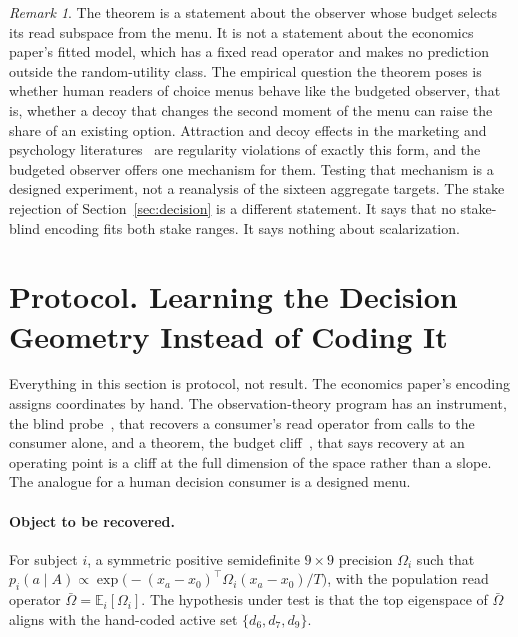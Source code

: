 \documentclass[11pt]{article}
\theoremstyle{definition}
\theoremstyle{remark}
\newtheorem*{remark}{Remark}
\newcommand{\E}{\mathbb{E}}
\begin{document}
\begin{remark}
The theorem is a statement about the observer whose budget selects its read subspace from the menu.
It is not a statement about the economics paper's fitted model, which has a fixed read operator and makes no prediction outside the random-utility class.
The empirical question the theorem poses is whether human readers of choice menus behave like the budgeted observer, that is, whether a decoy that changes the second moment of the menu can raise the share of an existing option.
Attraction and decoy effects in the marketing and psychology literatures~\cite{huber1982} are regularity violations of exactly this form, and the budgeted observer offers one mechanism for them.
Testing that mechanism is a designed experiment, not a reanalysis of the sixteen aggregate targets.
The stake rejection of Section~\ref{sec:decision} is a different statement. It says that no stake-blind encoding fits both stake ranges. It says nothing about scalarization.
\end{remark}

\section{Protocol. Learning the Decision Geometry Instead of Coding It}
\label{sec:learned}

Everything in this section is protocol, not result.
The economics paper's encoding assigns coordinates by hand.
The observation-theory program has an instrument, the blind probe~\cite{bond2026readscope,bond2026encyclopedia}, that recovers a consumer's read operator from calls to the consumer alone, and a theorem, the budget cliff~\cite{bond2026encyclopedia}, that says recovery at an operating point is a cliff at the full dimension of the space rather than a slope.
The analogue for a human decision consumer is a designed menu.

\paragraph{Object to be recovered.}
For subject $i$, a symmetric positive semidefinite $9\times9$ precision $\Omega_{i}$ such that $p_{i}(a\mid A)\propto\exp\bigl(-(x_{a}-x_{0})^{\top}\Omega_{i}(x_{a}-x_{0})/T\bigr)$, with the population read operator $\bar{\Omega}=\E_{i}[\Omega_{i}]$.
The hypothesis under test is that the top eigenspace of $\bar{\Omega}$ aligns with the hand-coded active set $\{d_{6},d_{7},d_{9}\}$.
\end{document}
